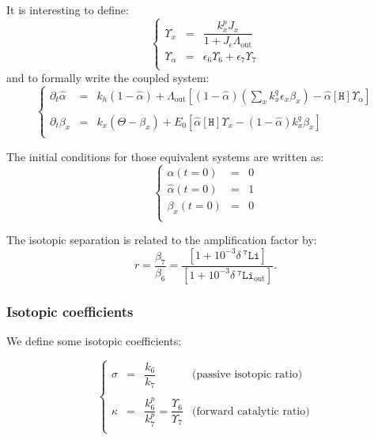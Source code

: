 \documentclass[aps,onecolumn,11pt]{revtex4}
\newcommand{\mychem}[1]{\mathtt{#1}}
\newcommand{\myconc}[1]{\left\lbrack{#1}\right\rbrack}
\newcommand{\spLi}[1]{{~^{\mychem{#1}}\mychem{Li}}}
\newcommand{\spproton}{\mychem{H}}
\newcommand{\proton}{\myconc{\spproton}}
\newcommand{\deltaLi}{ {\delta\!\!\!\spLi{7}} }
\newcommand{\deltaLiOut}{{\deltaLi}_{\mathrm{out}}}
\newcommand{\LiAll}{\Lambda}
\newcommand{\LiAllOut}{{\LiAll}_{\mathrm{out}}}
\begin{document}
It is interesting to define:
\begin{equation}
\label{eq:upsilon}
\left\lbrace
\begin{array}{rcl}
	\Upsilon_x & = & \dfrac{k^p_x J_x}{1+J_\epsilon \LiAllOut}\\
	\Upsilon_\alpha & = & \epsilon_6 \Upsilon_6 + \epsilon_7 \Upsilon_7\\
\end{array}
\right.
\end{equation}
and to formally write the coupled system:
\begin{equation}
\label{eq:sysall}
\left\lbrace
\begin{array}{rcl}
\partial_t \hat\alpha & = &
	 k_h \left(1-\hat\alpha\right) 
	 + \LiAllOut \left[ (1-\hat\alpha) \left( {\sum_x k_x^q \epsilon_x \beta_x} \right)  - \hat\alpha\proton \Upsilon_\alpha \right]\\
	 \\
	\partial_t \beta_x & = & k_x\left(\Theta - \beta_x\right) +E_0\left[ \hat\alpha  \proton \Upsilon_x - (1-\hat\alpha) k^q_x \beta_x \right]\\
\end{array}
\right.
\end{equation}

The initial conditions for those equivalent systems are written as:
\begin{equation}
\label{eq:ini}
\left\lbrace
\begin{array}{rcl}
\alpha(t=0) & = & 0\\
\hat\alpha(t=0) &= & 1\\
\beta_x(t=0)    &=& 0\\
\end{array}
\right.
\end{equation}

The isotopic separation is related to the amplification factor by:
\begin{equation}
	r=\dfrac{ \beta_7}{\beta_6} = \dfrac{\left[1+10^{-3}\deltaLi\right]}{\left[1+10^{-3}\deltaLiOut\right]}
	.
\end{equation}

\subsubsection{Isotopic coefficients}
We define some isotopic coefficients:

\begin{equation}
\label{eq:coeffs}
\left\lbrace
\begin{array}{rcll}
\sigma & = & \dfrac{k_6}{k_7} & \text{(passive isotopic ratio)}\\
\\
\kappa & = & \dfrac{k^p_6}{k^p_7} = \dfrac{\Upsilon_6}{\Upsilon_7}& \text{(forward catalytic ratio)}\\
\end{array}
\right.
\end{equation}
\end{document}
